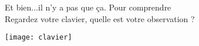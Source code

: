 \documentclass{beamer}
\begin{document}
\begin{frame}
                                                                                                                                                                                                                                                                                                                                                                                                                                                                                                                                                                                                                                                                                                                                                                                                                                                                                                                                                                                                                                                                                                                     Et bien...il n'y a pas que ça. Pour comprendre\\ 
Regardez votre clavier, quelle est votre observation ?
\begin{center}
\texttt{[image: clavier]}                                                                                                                                                                                                                                                                                                                                                                                                                                                                                                                                                                                                                                                                                                                                                                                                                                                                                                                                                                                                                                                                                                                                                                                                                                                                                                                                                                                                                                                                                                                                                                                                                                                                                                                                                                                                                                                                                                                                                                                                     \end{center}

\end{frame}
\end{document}
